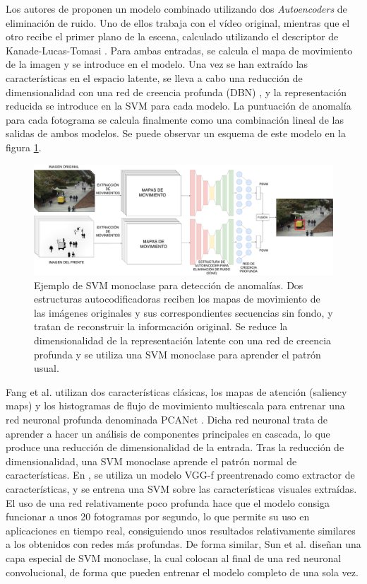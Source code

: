 \documentclass[../main.tex]{memoir}
\begin{document}
Los autores de \cite{yang2019deep} proponen un modelo combinado
utilizando dos \textit{Autoencoders} de eliminación de ruido. Uno de
ellos trabaja con el vídeo original, mientras que el otro recibe el
primer plano de la escena, calculado utilizando el descriptor de
Kanade-Lucas-Tomasi \cite{lucas1981iterative}. Para ambas entradas, se
calcula el mapa de movimiento de la imagen y se introduce en el
modelo.  Una vez se han extraído las características en el espacio
latente, se lleva a cabo una reducción de dimensionalidad con una red
de creencia profunda (DBN) \cite{hinton2006fast}, y la representación
reducida se introduce en la SVM para cada modelo. La puntuación de
anomalía para cada fotograma se calcula finalmente como una
combinación lineal de las salidas de ambos modelos. Se puede observar
un esquema de este modelo en la figura \ref{fig:sdae-psvm}.\\

\begin{figure}[hbtp]
  \centering
  \includegraphics[width=.9\textwidth]{images/sdae_psvm.pdf}
  \caption{Ejemplo de SVM monoclase para detección de anomalías. Dos
    estructuras autocodificadoras reciben los mapas de movimiento de
    las imágenes originales y sus correspondientes secuencias sin
    fondo, y tratan de reconstruir la informcación original. Se reduce
    la dimensionalidad de la representación latente con una red de
    creencia profunda y se utiliza una SVM monoclase para aprender el
    patrón usual.}
  \label{fig:sdae-psvm}
\end{figure}

Fang et al. \cite{fang2016abnormal} utilizan dos características
clásicas, los mapas de atención (saliency maps) \cite{fang2011bottom}
y los histogramas de flujo de movimiento multiescala para entrenar una
red neuronal profunda denominada PCANet \cite{chan2015pcanet}.  Dicha
red neuronal trata de aprender a hacer un análisis de componentes
principales en cascada, lo que produce una reducción de
dimensionalidad de la entrada. Tras la reducción de dimensionalidad,
una SVM monoclase aprende el patrón normal de características. En
\cite{smeureanu2017deep}, se utiliza un modelo VGG-f
\cite{chatfield2014return} preentrenado como extractor de
características, y se entrena una SVM sobre las características
visuales extraídas. El uso de una red relativamente poco profunda hace
que el modelo consiga funcionar a unos 20 fotogramas por segundo, lo
que permite su uso en aplicaciones en tiempo real, consiguiendo unos
resultados relativamente similares a los obtenidos con redes más
profundas. De forma similar, Sun et al. \cite{sun2019abnormal} diseñan
una capa especial de SVM monoclase, la cual colocan al final de una
red neuronal convolucional, de forma que pueden entrenar el modelo
completo de una sola vez.\\
\end{document}
